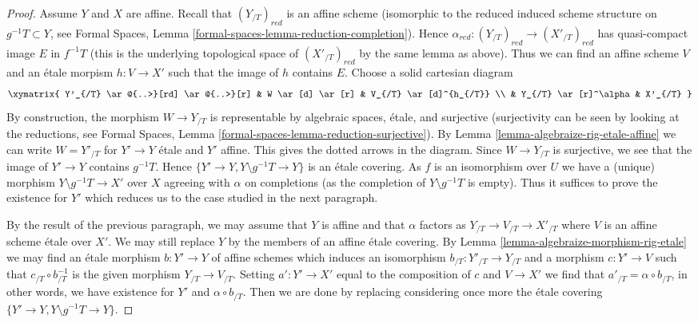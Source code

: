 \begin{proof}
\medskip\noindent
Assume $Y$ and $X$ are affine. Recall that $(Y_{/T})_{red}$
is an affine scheme (isomorphic to the reduced induced scheme structure
on $g^{-1}T \subset Y$, see Formal Spaces, Lemma
\ref{formal-spaces-lemma-reduction-completion}).
Hence $\alpha_{red} : (Y_{/T})_{red} \to (X'_{/T})_{red}$
has quasi-compact image $E$ in $f^{-1}T$ (this is the underlying
topological space of $(X'_{/T})_{red}$ by the same lemma as above).
Thus we can find an affine scheme $V$ and an \'etale morpism
$h : V \to X'$ such that the image of $h$ contains $E$.
Choose a solid cartesian diagram
$$
\xymatrix{
Y'_{/T} \ar@{..>}[rd] \ar@{..>}[r] &
W \ar[d] \ar[r] & V_{/T} \ar[d]^{h_{/T}} \\
& Y_{/T} \ar[r]^\alpha & X'_{/T}
}
$$
By construction, the morphism $W \to Y_{/T}$ is representable by
algebraic spaces, \'etale, and surjective
(surjectivity can be seen by looking at the reductions, see
Formal Spaces, Lemma
\ref{formal-spaces-lemma-reduction-surjective}).
By Lemma \ref{lemma-algebraize-rig-etale-affine}
we can write $W = Y'_{/T}$ for $Y' \to Y$ \'etale and $Y'$ affine.
This gives the dotted arrows in the diagram.
Since $W \to Y_{/T}$ is surjective, we see that
the image of $Y' \to Y$ contains $g^{-1}T$.
Hence $\{Y' \to Y, Y \setminus g^{-1}T \to Y\}$
is an \'etale covering. As $f$ is an isomorphism over $U$ we have a
(unique) morphism $Y \setminus g^{-1}T \to X'$ over $X$
agreeing with $\alpha$ on completions
(as the completion of $Y \setminus g^{-1}T$ is empty).
Thus it suffices to prove the existence for $Y'$
which reduces us to the case studied in the next paragraph.

\medskip\noindent
By the result of the previous paragraph, we may assume that $Y$ is affine
and that $\alpha$ factors as $Y_{/T} \to V_{/T} \to X'_{/T}$
where $V$ is an affine scheme \'etale over $X'$. We may still replace $Y$ by
the members of an affine \'etale covering.
By Lemma \ref{lemma-algebraize-morphism-rig-etale}
we may find an \'etale morphism $b : Y' \to Y$ of affine schemes
which induces an isomorphism $b_{/T} : Y'_{/T} \to Y_{/T}$
and a morphism $c : Y' \to V$ such that $c_{/T} \circ b_{/T}^{-1}$
is the given morphism $Y_{/T} \to V_{/T}$. Setting
$a' : Y' \to X'$ equal to the composition of $c$ and $V \to X'$
we find that $a'_{/T} = \alpha \circ b_{/T}$, in other words, we have
existence for $Y'$ and $\alpha \circ b_{/T}$.
Then we are done by replacing considering once more
the \'etale covering $\{Y' \to Y, Y \setminus g^{-1}T \to Y\}$.
\end{proof}

